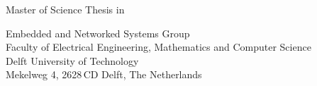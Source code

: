 
%
%
%
%

\begin{titlepage}

\begin{center}
\null\vfill
\begin{center}
\LARGE{\reportTitle}
\end{center}

\vspace{3cm}

\begin{large}
Master of Science Thesis in \reportMSC
\end{large}

\vspace{1.5cm}

\begin{normalsize}
Embedded and Networked Systems Group\\
Faculty of Electrical Engineering, Mathematics and Computer Science\\
Delft University of Technology\\
Mekelweg 4, 2628\,CD Delft, The Netherlands
\end{normalsize}

\vspace{2.0cm}

\begin{normalsize}
\reportAuthor \\
\reportUrlEmailTUD \\
\reportUrlEmailNonTUD
\end{normalsize}

\vspace{1.0cm}

\reportDate

\vfill
\end{center}

\end{titlepage}
